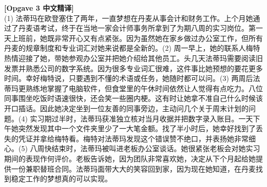 \begin{answerbox}
\textbf{\color{NCDTeal}[Opgave 3 中文精译]}\\
(1) 法蒂玛在欧登塞住了两年，一直梦想在丹麦从事会计和财务工作。上个月她通过了丹麦语考试，终于在当地一家会计师事务所拿到了为期八周的实习岗位。第一天上班前，她既非常开心又有点紧张。因为虽然她在家乡做过办公室工作，但所有丹麦的规章制度和专业词汇对她来说都是全新的。(2) 周一早上，她的联系人梅特热情迎接了她，带她参观办公室并把她介绍给其他员工。头几天法蒂玛需要阅读旧发票并熟悉公司的数字系统。因为很多专业词汇很难，这件事比她预想的要花更多时间。幸好梅特说，只要遇到不懂的术语或任务，她随时都可以问。(3) 两周后法蒂玛更熟练地掌握了电脑软件，但食堂里的午休时间依然让人觉得有点吃力。八位同事围坐吃饭时语速很快，还会笑一些圈内梗。这有时让她拿不准自己什么时候该开口插话。因此她决定坐到一位友善的同事旁边，主动问几个关于周末计划的问题。(4) 实习期过半时，法蒂玛获准独立核对当月收据并把数字录入账目。一天下午她突然发现其中一个文件夹里少了一大笔金额。找了半小时后，她幸好找到了丢失的凭证并拿给梅特看。梅特对法蒂玛发现这个错误赞不绝口，并表扬她非常细心。(5) 八周快结束时，法蒂玛被叫进老板办公室谈话。她很紧张老板会对她实习期间的表现作何评价。老板告诉她，因为团队非常喜欢她，决定从下个月起给她提供一份兼职替班合同。法蒂玛面带大大的笑容回到家，因为现在她知道，在丹麦找到稳定工作的梦想真的可以实现。


\end{answerbox}
